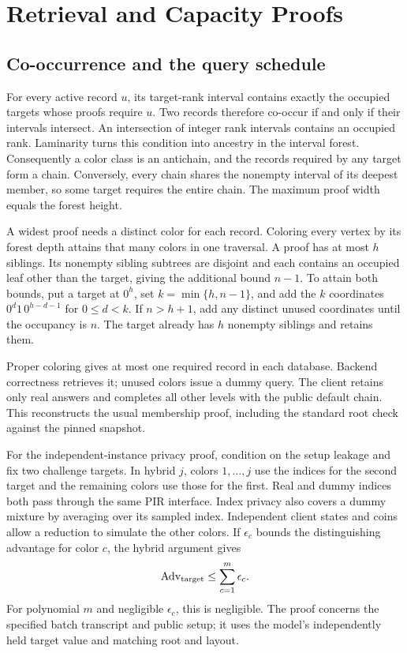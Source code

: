 \section{Retrieval and Capacity Proofs}

\subsection{Co-occurrence and the query schedule}
\label{sec:cooccurrence}
For every active record $u$, its target-rank interval contains exactly
the occupied targets whose proofs require $u$. Two records therefore
co-occur if and only if their intervals intersect. An intersection of
integer rank intervals contains an occupied rank. Laminarity turns this
condition into ancestry in the interval forest. Consequently a color
class is an antichain, and the records required by any target form a
chain. Conversely, every chain shares the nonempty interval of its
deepest member, so some target requires the entire chain. The maximum
proof width equals the forest height.

A widest proof needs a distinct color for each record. Coloring every
vertex by its forest depth attains that many colors in one traversal.
A proof has at most $h$ siblings. Its nonempty sibling subtrees are
disjoint and each contains an occupied leaf other than the target,
giving the additional bound $n-1$. To attain both bounds, put a target
at $0^h$, set $k=\min\{h,n-1\}$, and add the $k$ coordinates
$0^d1\,0^{h-d-1}$ for $0\le d<k$. If $n>h+1$, add any distinct unused
coordinates until the occupancy is $n$. The target already has $h$
nonempty siblings and retains them.

Proper coloring gives at most one required record in each database.
Backend correctness retrieves it; unused colors issue a dummy query.
The client retains only real answers and completes all other levels
with the public default chain. This reconstructs the usual membership
proof, including the standard root check against the pinned snapshot.

For the independent-instance privacy proof, condition on the setup leakage and fix two challenge
targets. In hybrid $j$, colors $1,\ldots,j$ use the indices for the
second target and the remaining colors use those for the first. Real
and dummy indices both pass through the same PIR interface. Index
privacy also covers a dummy mixture by averaging over its sampled
index. Independent client states and coins allow a reduction to
simulate the other colors. If $\epsilon_c$ bounds the distinguishing
advantage for color $c$, the hybrid argument gives
\begin{equation}
 \operatorname{Adv}_{\rm target}
 \le\sum_{c=1}^{m}\epsilon_c.
 \label{eq:supp-privacy-hybrid}
\end{equation}
For polynomial $m$ and negligible $\epsilon_c$, this is negligible.
The proof concerns the specified batch transcript and public setup;
it uses the model's independently held target value and matching root
and layout.

